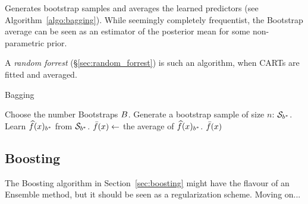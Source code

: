 Generates bootstrap samples and averages the learned predictors (see Algorithm~\ref{algo:bagging}). 
While seemingly completely frequentist, the Bootstrap average can be seen as an estimator of the posterior mean for some non-parametric prior.

A \emph{random forrest} (\S\ref{sec:random_forrest}) is such an algorithm, when CARTs are fitted and averaged.


\begin{algorithm}[H]
\caption{Bagging}
\label{algo:bagging}
\begin{algorithmic}
\State Choose the number Bootstraps $B$.
	\State Generate a bootstrap sample of size $n$: $\mathcal{S}_{b^*}$.
	\State Learn $\widehat{f}(x)_{{b^*}}$ from $\mathcal{S}_{b^*}$.
\EndFor
\State $\bar{f}(x) \gets$ the average of $\widehat{f}(x)_{{b^*}}$.
\State \Return $\bar{f}(x)$
\end{algorithmic}
\end{algorithm}





\subsection{Boosting}
The Boosting algorithm in Section~\ref{sec:boosting} might have the flavour of an Ensemble method, but it should be seen as a regularization scheme. Moving on...

